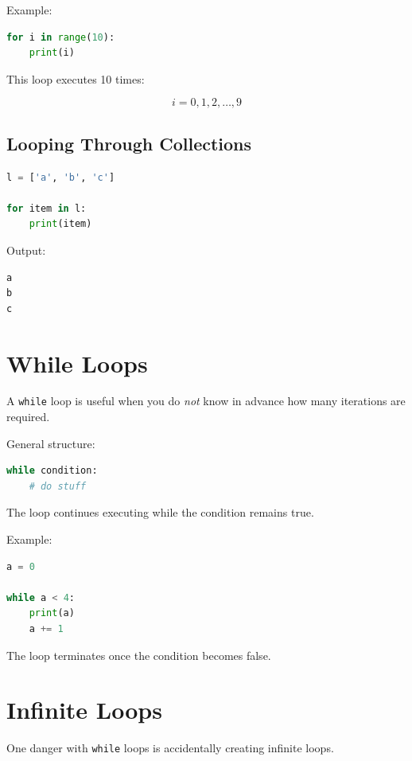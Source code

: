 \documentclass[11pt]{article}
\begin{document}
Example:

\begin{lstlisting}[language=Python]
for i in range(10):
    print(i)
\end{lstlisting}

This loop executes 10 times:

\[
i = 0,1,2,\ldots,9
\]

\subsection{Looping Through Collections}

\begin{lstlisting}[language=Python]
l = ['a', 'b', 'c']

for item in l:
    print(item)
\end{lstlisting}

Output:

\begin{lstlisting}
a
b
c
\end{lstlisting}

\section{While Loops}

A \texttt{while} loop is useful when you do \emph{not} know in advance how many iterations are required.

General structure:

\begin{lstlisting}[language=Python]
while condition:
    # do stuff
\end{lstlisting}

The loop continues executing while the condition remains true.

Example:

\begin{lstlisting}[language=Python]
a = 0

while a < 4:
    print(a)
    a += 1
\end{lstlisting}

The loop terminates once the condition becomes false.

\section{Infinite Loops}

One danger with \texttt{while} loops is accidentally creating infinite loops.
\end{document}
